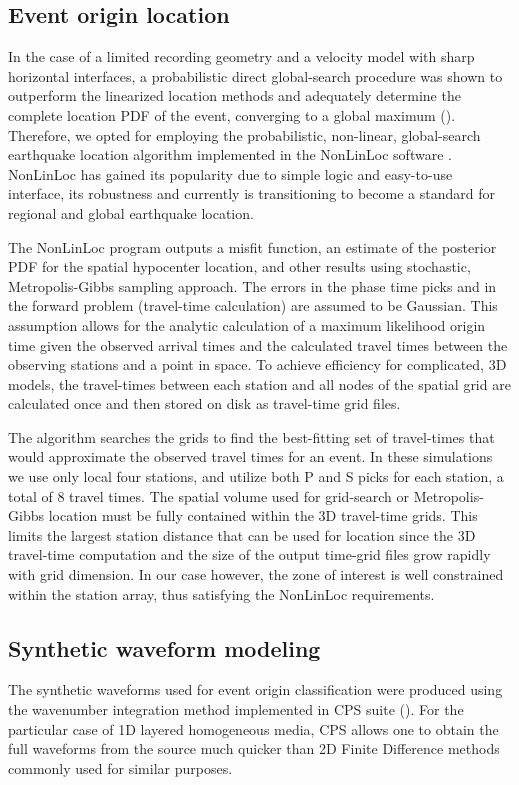\subsection{Event origin location} %
In the case of a limited recording geometry and a velocity model with sharp horizontal interfaces, a probabilistic direct global-search procedure was shown to outperform the linearized location methods and adequately determine the complete location PDF of the event, converging to a global maximum (\citet{lomax_earthquake_2009}). Therefore, we opted for employing the probabilistic, non-linear, global-search earthquake location algorithm implemented in the NonLinLoc software \cite{lomax_precise_2001}. NonLinLoc has gained its popularity due to simple logic and easy-to-use interface, its robustness and currently is transitioning to become a standard for regional and global earthquake location.

The NonLinLoc program outputs a misfit function, an estimate of the posterior PDF for the spatial hypocenter location, and other results using stochastic, Metropolis-Gibbs sampling approach. The errors in the phase time picks and in the forward problem (travel-time calculation) are assumed to be Gaussian. This assumption allows for the analytic calculation of a maximum likelihood origin time given the observed arrival times and the calculated travel times between the observing stations and a point in space. To achieve efficiency for complicated, 3D models, the travel-times between each station and all nodes of the spatial grid are calculated once and then stored on disk as travel-time grid files.

The algorithm searches the grids to find the best-fitting set of travel-times that would approximate the observed travel times for an event. In these simulations we use only local four stations, and utilize both P and S picks for each station, a total of 8 travel times. The spatial volume used for grid-search or Metropolis-Gibbs location must be fully contained within the 3D travel-time grids. This limits the largest station distance that can be used for location since the 3D travel-time computation and the size of the output time-grid files grow rapidly with grid dimension. In our case however, the zone of interest is well constrained within the station array, thus satisfying the NonLinLoc requirements.

\subsection{Synthetic waveform modeling}
The synthetic waveforms used for event origin classification were produced using the wavenumber integration method implemented in CPS suite (\cite{herrmann_computer_2013}). For the particular case of 1D layered homogeneous media, CPS allows one to obtain the full waveforms from the source much quicker than 2D Finite Difference methods commonly used for similar purposes.

